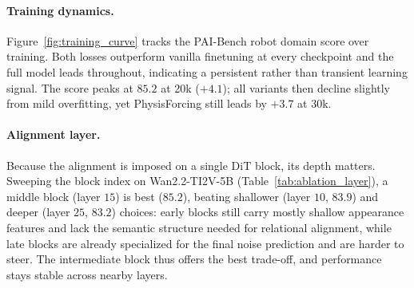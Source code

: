 \paragraph{Training dynamics.}
Figure~\ref{fig:training_curve} tracks the PAI-Bench robot domain score over training. Both
losses outperform vanilla finetuning at every checkpoint and the full model leads throughout,
indicating a persistent rather than transient learning signal. The score peaks at $85.2$ at
20k ($+4.1$); all variants then decline slightly from mild overfitting, yet PhysisForcing
still leads by $+3.7$ at 30k.

\paragraph{Alignment layer.}
Because the alignment is imposed on a single DiT block, its depth matters. Sweeping the block
index on Wan2.2-TI2V-5B (Table~\ref{tab:ablation_layer}), a middle block (layer $15$) is best
($85.2$), beating shallower (layer $10$, $83.9$) and deeper (layer $25$, $83.2$) choices: early
blocks still carry mostly shallow appearance features and lack the semantic structure needed
for relational alignment, while late blocks are already specialized for the final noise prediction and
are harder to steer. The intermediate block thus offers the best trade-off, and performance
stays stable across nearby layers.